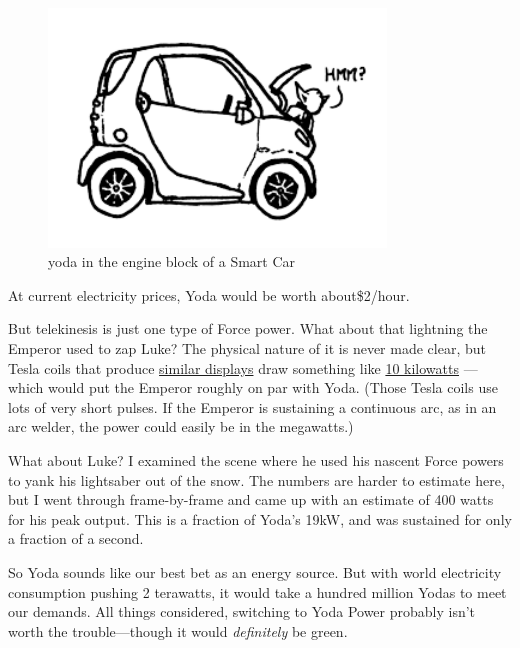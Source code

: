 \begin{figure}[!htbp]
\centering
\includegraphics[scale=0.5, max width=0.8\textwidth]{imgs/a/3/06.png}
\caption{yoda in the engine block of a Smart Car}
\end{figure}

{At current electricity prices, Yoda would be worth about\$2/hour.}

{But telekinesis is just one type of Force power. What about that lightning the Emperor used to zap Luke? The physical nature of it is never made clear, but Tesla coils that produce \href{http://www.youtube.com/watch?v=uNJjnz-GdlE}{similar displays} draw something like \href{http://www.goodchildengineering.net/tesla-coils/drsstc-5-10kw-monster}{10 kilowatts} —which would put the Emperor roughly on par with Yoda. (Those Tesla coils use lots of very short pulses. If the Emperor is sustaining a continuous arc, as in an arc welder, the power could easily be in the megawatts.)}

{What about Luke? I examined the scene where he used his nascent Force powers to yank his lightsaber out of the snow. The numbers are harder to estimate here, but I went through frame-by-frame and came up with an estimate of 400 watts for his peak output. This is a fraction of Yoda's 19kW, and was sustained for only a fraction of a second.}

{So Yoda sounds like our best bet as an energy source. But with world electricity consumption pushing 2 terawatts, it would take a hundred million Yodas to meet our demands. All things considered, switching to Yoda Power probably isn’t worth the trouble—though it would \emph{definitely} be green.}

